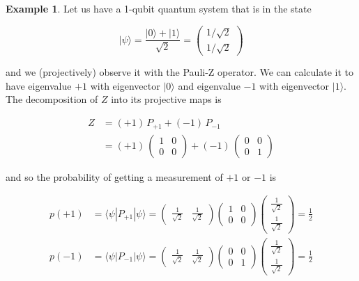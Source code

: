 \documentclass{article}
\theoremstyle{definition}
\newtheorem{example}{Example}[section]
\begin{document}
      \begin{example}
        Let us have a 1-qubit quantum system that is in the state

          \[|\psi \rangle = \frac{|0\rangle + |1 \rangle}{\sqrt{2}} = \begin{pmatrix} 1/\sqrt{2} \\ 1/\sqrt{2} \end{pmatrix}\]

        and we (projectively) observe it with the Pauli-Z operator. We can calculate it to have eigenvalue $+1$ with eigenvector $|0\rangle$ and eigenvalue $-1$ with eigenvector $|1\rangle$. The decomposition of $Z$ into its projective maps is

        \begin{align*}
          Z & = (+1) \, P_{+1} + (-1)\, P_{-1} \\
          & = (+1) \, \begin{pmatrix} 1&0\\0&0 \end{pmatrix} + (-1)\, \begin{pmatrix} 0&0\\0&1 \end{pmatrix}
        \end{align*}

        and so the probability of getting a measurement of $+1$ or $-1$ is

        \begin{align*}
          p(+1) & = \langle \psi | P_{+1} | \psi \rangle = \begin{pmatrix} \frac{1}{\sqrt{2}} & \frac{1}{\sqrt{2}} \end{pmatrix} \begin{pmatrix} 1&0\\0&0 \end{pmatrix} \begin{pmatrix} \frac{1}{\sqrt{2}} \\ \frac{1}{\sqrt{2}} \end{pmatrix} = \frac{1}{2} \\
          p(-1) & = \langle \psi | P_{-1} | \psi \rangle = \begin{pmatrix} \frac{1}{\sqrt{2}} & \frac{1}{\sqrt{2}} \end{pmatrix} \begin{pmatrix} 0&0\\0&1 \end{pmatrix} \begin{pmatrix} \frac{1}{\sqrt{2}} \\ \frac{1}{\sqrt{2}} \end{pmatrix} = \frac{1}{2}
        \end{align*}
      \end{example}
\end{document}

